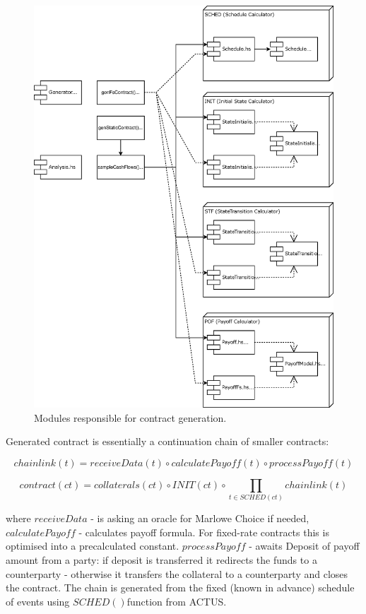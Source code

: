 \documentclass[runningheads]{llncs}
\begin{document}
\begin{figure}
\includegraphics[width=1\textwidth]{images/modules} \caption{Modules responsible for contract generation.}
\label{fig1} 
\end{figure}

Generated contract is essentially a continuation chain of smaller
contracts:

\noindent 
\begin{equation}
chainlink(t)=receiveData(t)\circ calculatePayoff(t)\circ processPayoff(t)
\end{equation}

\noindent 
\begin{equation}
contract(ct)=collaterals(ct)\circ INIT(ct)\circ\prod_{t\in SCHED(ct)}chainlink(t)
\end{equation}

where $receiveData$ - is asking an oracle for Marlowe Choice if needed,
$calculatePayoff$ - calculates payoff formula. For fixed-rate contracts
this is optimised into a precalculated constant. $processPayoff$
- awaits Deposit of payoff amount from a party: if deposit is transferred
it redirects the funds to a counterparty - otherwise it transfers
the collateral to a counterparty and closes the contract. The chain
is generated from the fixed (known in advance) schedule of events
using $SCHED()$function from ACTUS.
\end{document}
